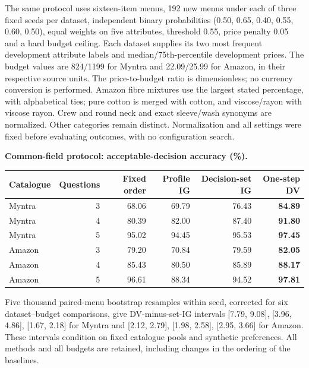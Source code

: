 \documentclass[sigconf,anonymous,review]{acmart}
\begin{document}
The same protocol uses sixteen-item menus, 192 new menus under each of three fixed seeds per dataset, independent binary probabilities (0.50, 0.65, 0.40, 0.55, 0.60, 0.50), equal weights on five attributes, threshold 0.55, price penalty 0.05 and a hard budget ceiling. Each dataset supplies its two most frequent development attribute labels and median/75th-percentile development prices. The budget values are 824/1199 for Myntra and 22.09/25.99 for Amazon, in their respective source units. The price-to-budget ratio is dimensionless; no currency conversion is performed. Amazon fibre mixtures use the largest stated percentage, with alphabetical ties; pure cotton is merged with cotton, and viscose/rayon with viscose rayon. Crew and round neck and exact sleeve/wash synonyms are normalized. Other categories remain distinct. Normalization and all settings were fixed before evaluating outcomes, with no configuration search.

\begin{center}
\small\textbf{Common-field protocol: acceptable-decision accuracy (\%).}
\par\medskip
\begin{tabularx}{\textwidth}{@{}Lrrrrr@{}}\toprule
Catalogue & Questions & Fixed order & Profile IG & Decision-set IG & One-step DV\\\midrule
Myntra & 3 & 68.06 & 69.79 & 76.43 & \textbf{84.89}\\
Myntra & 4 & 80.39 & 82.00 & 87.40 & \textbf{91.80}\\
Myntra & 5 & 95.02 & 94.45 & 95.53 & \textbf{97.45}\\
Amazon & 3 & 79.20 & 70.84 & 79.59 & \textbf{82.05}\\
Amazon & 4 & 85.43 & 80.50 & 85.89 & \textbf{88.17}\\
Amazon & 5 & 96.61 & 88.34 & 94.52 & \textbf{97.81}\\
\bottomrule
\end{tabularx}
\end{center}

Five thousand paired-menu bootstrap resamples within seed, corrected for six dataset--budget comparisons, give DV-minus-set-IG intervals [7.79, 9.08], [3.96, 4.86], [1.67, 2.18] for Myntra and [2.12, 2.79], [1.98, 2.58], [2.95, 3.66] for Amazon. These intervals condition on fixed catalogue pools and synthetic preferences. All methods and all budgets are retained, including changes in the ordering of the baselines.
\end{document}
